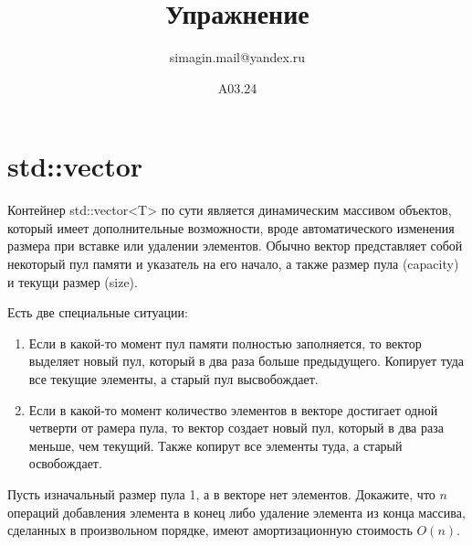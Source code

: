 \documentclass[10pt, oneside, notitlepage]{article}
\title{Упражнение}
\author{simagin.mail@yandex.ru}
\date{A03.24}
\begin{document}
\maketitle


\section*{std::vector}
    Контейнер std::vector<T> по сути является динамическим массивом объектов,
    который имеет дополнительные возможности,
    вроде автоматического изменения размера при вставке или удалении элементов.
    Обычно вектор представляет собой некоторый пул памяти и указатель на его начало,
    а также размер пула (capacity) и текущи размер (size).

    Есть две специальные ситуации:
    \begin{enumerate}
        \item Если в какой-то момент пул памяти полностью заполняется,
        то вектор выделяет новый пул, который в два раза больше предыдущего.
        Копирует туда все текущие элементы, а старый пул высвобождает.
        \item Если в какой-то момент количество элементов в векторе достигает одной четверти от рамера пула,
        то вектор создает новый пул, который в два раза меньше, чем текущий.
        Также копирут все элементы туда, а старый освобождает.
    \end{enumerate}

    Пусть изначальный размер пула 1, а в векторе нет элементов.
    Докажите, что $n$ операций добавления элемента в конец либо удаление элемента из конца массива,
    сделанных в произвольном порядке, имеют амортизационную стоимость $O(n)$.
\end{document}
